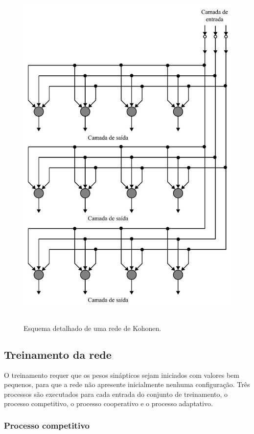 \begin{figure}[H]
  \begin{center}
    \includegraphics[height=18cm]{imagens/rede_detalhada.pdf}
  \end{center}
  \caption{ Esquema detalhado de uma rede de Kohonen. }
  \label{fig:kohonen_esquema}
\end{figure}

\subsection{Treinamento da rede}

O treinamento requer que os pesos sinápticos sejam iniciados com valores bem
pequenos, para que a rede não apresente inicialmente nenhuma configuração. Três
processos são executados para cada entrada do conjunto de treinamento, o
processo competitivo, o processo cooperativo e o processo adaptativo.

\subsubsection{Processo competitivo}

